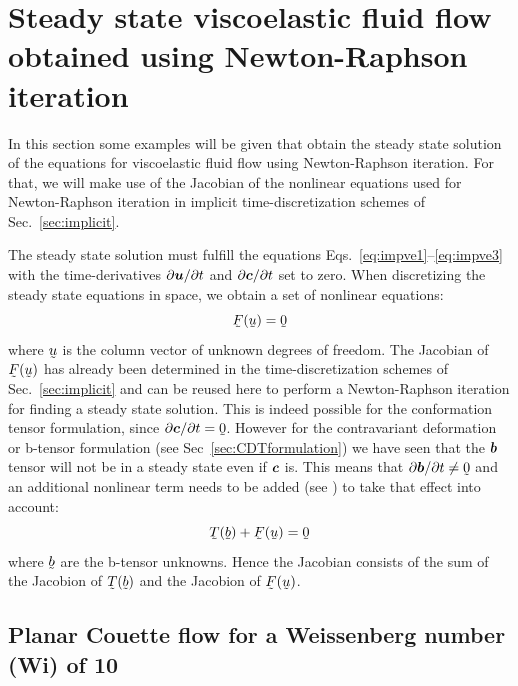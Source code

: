 
\def\headdate{14th September 2024}

\section{Steady state viscoelastic fluid flow obtained using Newton-Raphson iteration}
\label{sec:steadyviscoelastic}

In this section some examples will be given that obtain the steady state solution
of the equations for viscoelastic fluid flow using Newton-Raphson iteration. For that, we will make use of the
Jacobian of the nonlinear equations used for Newton-Raphson iteration in implicit time-discretization schemes of
Sec.~\ref{sec:implicit}.

The steady state solution must fulfill the equations Eqs.~\eqref{eq:impve1}--\eqref{eq:impve3} with the time-derivatives $\partial \boldsymbol{u}/\partial t$ and $\partial \boldsymbol{c}/\partial t$ set to zero.
When discretizing the steady state equations in space, we obtain a set of nonlinear equations:
\begin{equation}
  \col F(\col u) = \col 0
\end{equation}
where $\col u$ is the column vector of unknown degrees of freedom. The Jacobian of $\col F(\col u)$ has
already been determined in the time-discretization schemes of
Sec.~\ref{sec:implicit} and can be reused here to perform a Newton-Raphson iteration for finding a steady state solution.
This is indeed possible for the conformation tensor formulation, since $\plderiv{\ten c}t=\col 0$. However for the contravariant deformation or b-tensor formulation (see Sec~\ref{sec:CDTformulation}) we have seen that the $\boldsymbol{b}$ tensor will not be in a steady state even if $\boldsymbol{c}$ is. This means that $\plderiv{\ten b}t\neq\col 0$ and an additional nonlinear term needs to be added (see \cite{JaenssonHulsen2024}) to take that effect into account:
 \begin{equation}
  \col T(\col b) + \col F(\col u) = \col 0
\end{equation}
where $\col b$ are the b-tensor unknowns.
Hence the Jacobian consists of the sum of the Jacobion of $\col T(\col b)$ and the Jacobion  of $\col F(\col u)$.

\subsection{Planar Couette flow for a Weissenberg number (Wi) of 10}
\label{sec:couette_steady_implicit}

